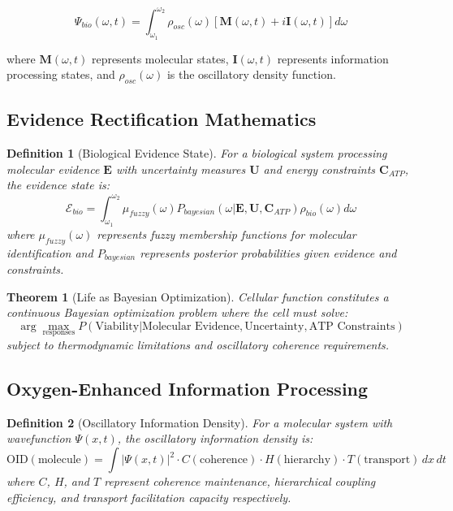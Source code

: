 \documentclass[12pt,a4paper]{article}
\newtheorem{theorem}{Theorem}
\newtheorem{definition}{Definition}
\begin{document}
\begin{equation}
\Psi_{bio}(\omega, t) = \int_{\omega_1}^{\omega_2} \rho_{osc}(\omega) [\mathbf{M}(\omega, t) + i\mathbf{I}(\omega, t)] d\omega
\end{equation}

where $\mathbf{M}(\omega, t)$ represents molecular states, $\mathbf{I}(\omega, t)$ represents information processing states, and $\rho_{osc}(\omega)$ is the oscillatory density function.

\subsection{Evidence Rectification Mathematics}

\begin{definition}[Biological Evidence State]
For a biological system processing molecular evidence $\mathbf{E}$ with uncertainty measures $\mathbf{U}$ and energy constraints $\mathbf{C}_{ATP}$, the evidence state is:
\begin{equation}
\mathcal{E}_{bio} = \int_{\omega_1}^{\omega_2} \mu_{fuzzy}(\omega) P_{bayesian}(\omega | \mathbf{E}, \mathbf{U}, \mathbf{C}_{ATP}) \rho_{bio}(\omega) d\omega
\end{equation}
where $\mu_{fuzzy}(\omega)$ represents fuzzy membership functions for molecular identification and $P_{bayesian}$ represents posterior probabilities given evidence and constraints.
\end{definition}

\begin{theorem}[Life as Bayesian Optimization]
Cellular function constitutes a continuous Bayesian optimization problem where the cell must solve:
\begin{equation}
\arg\max_{\text{responses}} P(\text{Viability} | \text{Molecular Evidence}, \text{Uncertainty}, \text{ATP Constraints})
\end{equation}
subject to thermodynamic limitations and oscillatory coherence requirements.
\end{theorem}

\subsection{Oxygen-Enhanced Information Processing}

\begin{definition}[Oscillatory Information Density]
For a molecular system with wavefunction $\Psi(x,t)$, the oscillatory information density is:
\begin{equation}
\text{OID}(\text{molecule}) = \int |\Psi(x,t)|^2 \cdot C(\text{coherence}) \cdot H(\text{hierarchy}) \cdot T(\text{transport}) \, dx \, dt
\end{equation}
where $C$, $H$, and $T$ represent coherence maintenance, hierarchical coupling efficiency, and transport facilitation capacity respectively.
\end{definition}
\end{document}
